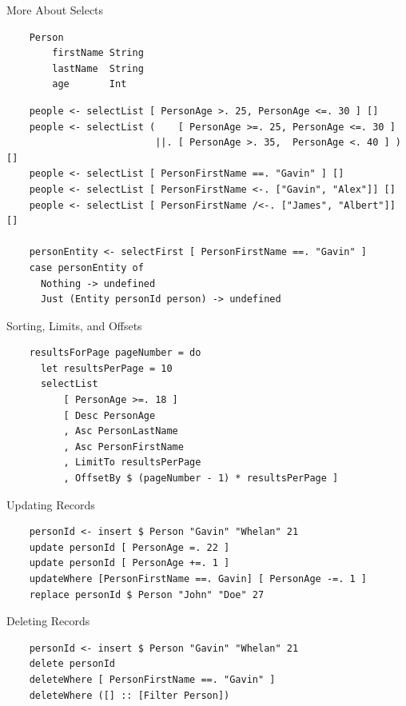 \documentclass[pdf]{beamer}
\begin{document}
\begin{frame}[fragile]{More About Selects}
  \begin{verbatim}
    Person
        firstName String
        lastName  String
        age       Int
  \end{verbatim}
  \pause
  \begin{verbatim}
    people <- selectList [ PersonAge >. 25, PersonAge <=. 30 ] []
    people <- selectList (    [ PersonAge >=. 25, PersonAge <=. 30 ]
                          ||. [ PersonAge >. 35,  PersonAge <. 40 ] ) []
    people <- selectList [ PersonFirstName ==. "Gavin" ] []
    people <- selectList [ PersonFirstName <-. ["Gavin", "Alex"]] []
    people <- selectList [ PersonFirstName /<-. ["James", "Albert"]] []

    personEntity <- selectFirst [ PersonFirstName ==. "Gavin" ]
    case personEntity of
      Nothing -> undefined
      Just (Entity personId person) -> undefined
  \end{verbatim}
\end{frame}

\begin{frame}[fragile]{Sorting, Limits, and Offsets}
  \begin{verbatim}
    resultsForPage pageNumber = do
      let resultsPerPage = 10
      selectList
          [ PersonAge >=. 18 ]
          [ Desc PersonAge
          , Asc PersonLastName
          , Asc PersonFirstName
          , LimitTo resultsPerPage
          , OffsetBy $ (pageNumber - 1) * resultsPerPage ]
  \end{verbatim}
\end{frame}

\begin{frame}[fragile]{Updating Records}
  \begin{verbatim}
    personId <- insert $ Person "Gavin" "Whelan" 21
    update personId [ PersonAge =. 22 ]
    update personId [ PersonAge +=. 1 ]
    updateWhere [PersonFirstName ==. Gavin] [ PersonAge -=. 1 ]
    replace personId $ Person "John" "Doe" 27
  \end{verbatim}
\end{frame}

\begin{frame}[fragile]{Deleting Records}
  \begin{verbatim}
    personId <- insert $ Person "Gavin" "Whelan" 21
    delete personId
    deleteWhere [ PersonFirstName ==. "Gavin" ]
    deleteWhere ([] :: [Filter Person])
  \end{verbatim}
\end{frame}
\end{document}
